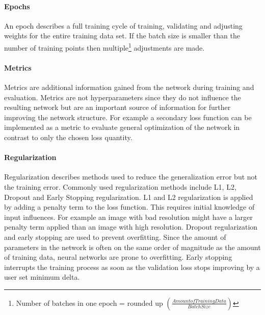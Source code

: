 		\paragraph{Epochs}
			An epoch describes a full training cycle of training, validating and adjusting weights for the entire training data set. If the batch size is smaller than the number of training points then multiple\footnote{Number of batches in one epoch = rounded up $\left(\frac{Amount of Training Data}{Batch Size}\right)$} adjustments are made.%
		\paragraph{Metrics}
			Metrics are additional information gained from the network during training and evaluation. Metrics are not hyperparameters since they do not influence the resulting network but are an important source of information for further improving the network structure. For example a secondary loss function can be implemented as a metric to evaluate general optimization of the network in contrast to only the chosen loss quantity. 
		\paragraph{Regularization}
			Regularization describes methods used to reduce the generalization error but not the training error. Commonly used regularization methods include L1, L2, Dropout and Early Stopping regularization. L1 and L2 regularization is applied by adding a penalty term to the loss function. This requires initial knowledge of input influences. For example an image with bad resolution might have a larger penalty term applied than an image with high resolution. Dropout regularization and early stopping are used to prevent overfitting. Since the amount of parameters in the network is often on the same order of magnitude as the amount of training data, neural networks are prone to overfitting. Early stopping interrupts the training process as soon as the validation loss stops improving by a user set minimum delta.
